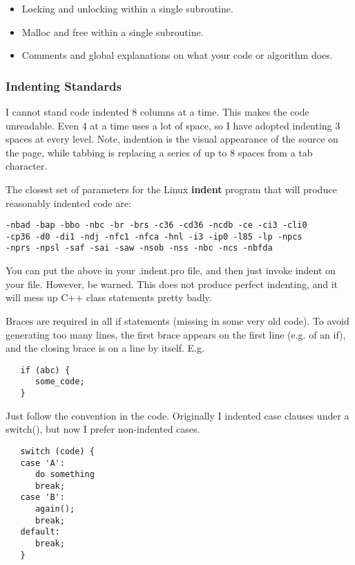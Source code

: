 \begin{itemize}
\item Locking and unlocking within a single subroutine.  
\item Malloc and free within a single subroutine.  
\item Comments and global explanations on what your code or  algorithm does. 
   \end{itemize}

\subsubsection*{Indenting Standards}

I cannot stand code indented 8 columns at a time. This makes the code
unreadable. Even 4 at a time uses a lot of space, so I have adopted indenting
3 spaces at every level. Note, indention is the visual appearance of the
source on the page, while tabbing is replacing a series of up to 8 spaces from
a tab character. 

The closest set of parameters for the Linux {\bf indent} program that will
produce reasonably indented code are: 

\footnotesize
\begin{verbatim}
-nbad -bap -bbo -nbc -br -brs -c36 -cd36 -ncdb -ce -ci3 -cli0
-cp36 -d0 -di1 -ndj -nfc1 -nfca -hnl -i3 -ip0 -l85 -lp -npcs
-nprs -npsl -saf -sai -saw -nsob -nss -nbc -ncs -nbfda
\end{verbatim}
\normalsize

You can put the above in your .indent.pro file, and then just invoke indent on
your file. However, be warned. This does not produce perfect indenting, and it
will mess up C++ class statements pretty badly. 

Braces are required in all if statements (missing in some very old code). To
avoid generating too many lines, the first brace appears on the first line
(e.g. of an if), and the closing brace is on a line by itself. E.g. 

\footnotesize
\begin{verbatim}
   if (abc) {
      some_code;
   }
\end{verbatim}
\normalsize

Just follow the convention in the code. Originally I indented case clauses
under a switch(), but now I prefer non-indented cases. 

\footnotesize
\begin{verbatim}
   switch (code) {
   case 'A':
      do something
      break;
   case 'B':
      again();
      break;
   default:
      break;
   }
\end{verbatim}
\normalsize

